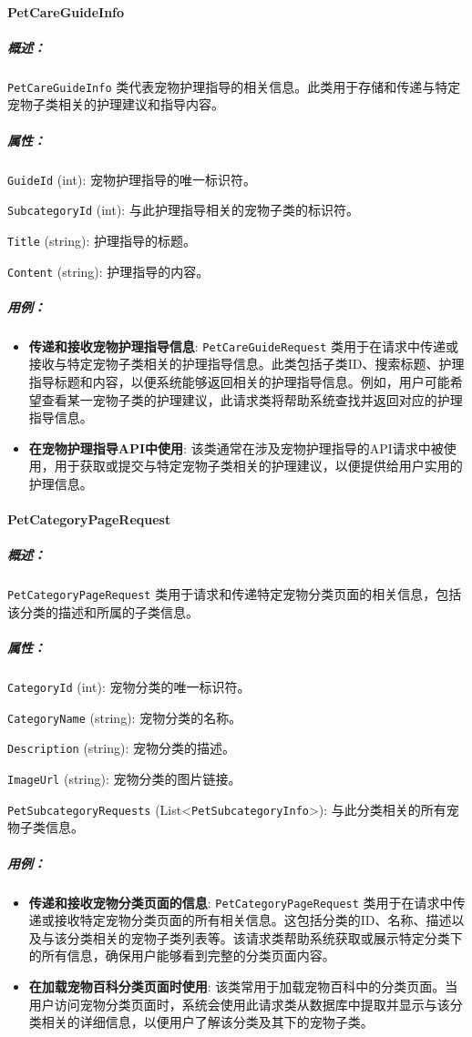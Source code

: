\paragraph{PetCareGuideInfo}
\subparagraph{概述：} \texttt{PetCareGuideInfo} 类代表宠物护理指导的相关信息。此类用于存储和传递与特定宠物子类相关的护理建议和指导内容。

\subparagraph{属性：}

\texttt{GuideId} (int): 宠物护理指导的唯一标识符。

\texttt{SubcategoryId} (int): 与此护理指导相关的宠物子类的标识符。

\texttt{Title} (string): 护理指导的标题。

\texttt{Content} (string): 护理指导的内容。


\subparagraph{用例：}
\begin{itemize}
	\item \textbf{传递和接收宠物护理指导信息}: \texttt{PetCareGuideRequest} 类用于在请求中传递或接收与特定宠物子类相关的护理指导信息。此类包括子类ID、搜索标题、护理指导标题和内容，以便系统能够返回相关的护理指导信息。例如，用户可能希望查看某一宠物子类的护理建议，此请求类将帮助系统查找并返回对应的护理指导信息。
	\item \textbf{在宠物护理指导API中使用}: 该类通常在涉及宠物护理指导的API请求中被使用，用于获取或提交与特定宠物子类相关的护理建议，以便提供给用户实用的护理信息。
\end{itemize}

\paragraph{PetCategoryPageRequest}
\subparagraph{概述：} \texttt{PetCategoryPageRequest} 类用于请求和传递特定宠物分类页面的相关信息，包括该分类的描述和所属的子类信息。

\subparagraph{属性：}

\texttt{CategoryId} (int): 宠物分类的唯一标识符。

\texttt{CategoryName} (string): 宠物分类的名称。

\texttt{Description} (string): 宠物分类的描述。

\texttt{ImageUrl} (string): 宠物分类的图片链接。

\texttt{PetSubcategoryRequests} (List<\texttt{PetSubcategoryInfo}>): 与此分类相关的所有宠物子类信息。


\subparagraph{用例：}
\begin{itemize}
	\item \textbf{传递和接收宠物分类页面的信息}: \texttt{PetCategoryPageRequest} 类用于在请求中传递或接收特定宠物分类页面的所有相关信息。这包括分类的ID、名称、描述以及与该分类相关的宠物子类列表等。该请求类帮助系统获取或展示特定分类下的所有信息，确保用户能够看到完整的分类页面内容。
	\item \textbf{在加载宠物百科分类页面时使用}: 该类常用于加载宠物百科中的分类页面。当用户访问宠物分类页面时，系统会使用此请求类从数据库中提取并显示与该分类相关的详细信息，以便用户了解该分类及其下的宠物子类。
\end{itemize}

